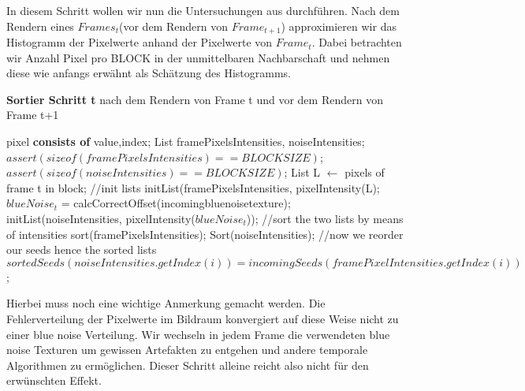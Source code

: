 In diesem Schritt wollen wir nun die Untersuchungen aus 
 durchführen. Nach dem Rendern eines
$Frames_{t}$(vor dem Rendern von $Frame_{t+1}$) approximieren wir das Histogramm
der Pixelwerte anhand der Pixelwerte von $Frame_{t}$. Dabei betrachten wir
Anzahl Pixel pro BLOCK in der unmittelbaren Nachbarschaft und nehmen diese
wie anfangs erwähnt als Schätzung des Histogramms.

\cite{hal02158423}
\begin{algorithm}[H]
    \caption{\textbf{Sortier Schritt t} nach dem Rendern von Frame t
    und vor dem Rendern von Frame t+1}
    \begin{algorithmic}[1]
        \State pixel \textbf{consists of} value,index;
        \State List framePixelsIntensities, noiseIntensities;
        \State $assert(sizeof(framePixelsIntensities)==BLOCKSIZE)$;
        \State $assert(sizeof(noiseIntensities)==BLOCKSIZE)$;
        \State List L $\leftarrow$ pixels of frame t in block;
        \State \hfill
        \State //init lists
        \State initList(framePixelsIntensities, pixelIntensity(L);
        \State $blueNoise_{t}$ = calcCorrectOffset(incomingbluenoisetexture);
        \State initList(noiseIntensities, pixelIntensity($blueNoise_{t}$));
        \State \hfill
        \State //sort the two lists by means of intensities
        \State sort(framePixelsIntensities);
        \State Sort(noiseIntensities);
        \State \hfill
        \State //now we reorder our seeds hence the sorted lists
        \State $sortedSeeds(noiseIntensities.getIndex(i)) = incomingSeeds(framePixelIntensities.getIndex(i))$;
        \EndFor
    \end{algorithmic}
    \label{alg:Sortier}
\end{algorithm}

Hierbei muss noch eine wichtige Anmerkung gemacht werden. Die Fehlerverteilung
der Pixelwerte im Bildraum konvergiert auf diese Weise nicht zu einer 
blue noise Verteilung. Wir wechseln in jedem Frame die 
verwendeten blue noise Texturen um gewissen Artefakten zu entgehen und 
andere temporale Algorithmen zu ermöglichen. Dieser Schritt alleine reicht
also nicht für den erwünschten Effekt.